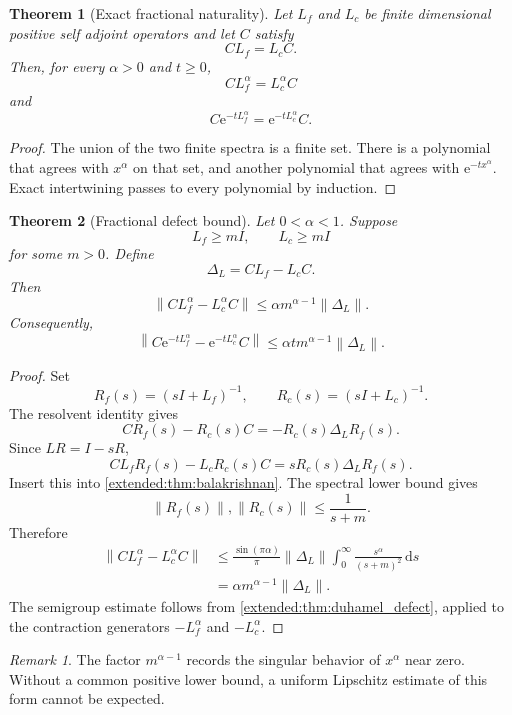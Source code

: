 \documentclass[11pt,letterpaper]{article}
\newtheorem{theorem}{Theorem}[section]
\theoremstyle{plain}
\theoremstyle{plain}
\theoremstyle{plain}
\theoremstyle{definition}
\theoremstyle{definition}
\theoremstyle{definition}
\theoremstyle{definition}
\theoremstyle{definition}
\theoremstyle{remark}
\theoremstyle{remark}
\newtheorem{remark}[remark]{Remark}
\theoremstyle{remark}
\theoremstyle{remark}
\theoremstyle{remark}
\newcommand{\norm}[1]{\left\lVert#1\right\rVert}
\theoremstyle{remark}
\newcommand{\e}{\mathrm e}
\newcommand{\dd}{\,\mathrm d}
\let\KomorebiPrimitivemathrm\mathrm
\renewcommand{\mathrm}[1]{{\KomorebiPrimitivemathrm{#1}}}
\begin{document}
\begin{theorem}[Exact fractional naturality]\label{extended:record:069}\label{extended:thm:exact_fractional_naturality}
Let \(L_f\) and \(L_c\) be finite dimensional positive self adjoint operators and let \(C\) satisfy
\[
CL_f=L_cC.
\]
Then, for every \(\alpha>0\) and \(t\geq0\),
\[
CL_f^\alpha=L_c^\alpha C
\]
and
\[
C\e^{-tL_f^\alpha}
=
\e^{-tL_c^\alpha}C.
\]
\end{theorem}

\begin{proof}
The union of the two finite spectra is a finite set. There is a polynomial that agrees with \(x^\alpha\) on that set, and another polynomial that agrees with \(\e^{-tx^\alpha}\). Exact intertwining passes to every polynomial by induction.
\end{proof}

\begin{theorem}[Fractional defect bound]\label{extended:record:070}\label{extended:thm:fractional_defect}
Let \(0<\alpha<1\). Suppose
\[
L_f\geq mI,
\qquad
L_c\geq mI
\]
for some \(m>0\). Define
\[
\Delta_L=CL_f-L_cC.
\]
Then
\[
\norm{CL_f^\alpha-L_c^\alpha C}
\leq
\alpha m^{\alpha-1}\norm{\Delta_L}.
\]
Consequently,
\[
\norm{
C\e^{-tL_f^\alpha}
-
\e^{-tL_c^\alpha}C
}
\leq
\alpha t m^{\alpha-1}\norm{\Delta_L}.
\]
\end{theorem}

\begin{proof}
Set
\[
R_f(s)=(sI+L_f)^{-1},
\qquad
R_c(s)=(sI+L_c)^{-1}.
\]
The resolvent identity gives
\[
CR_f(s)-R_c(s)C
=
-R_c(s)\Delta_LR_f(s).
\]
Since \(LR=I-sR\),
\[
CL_fR_f(s)-L_cR_c(s)C
=
sR_c(s)\Delta_LR_f(s).
\]
Insert this into \cref{extended:thm:balakrishnan}. The spectral lower bound gives
\[
\norm{R_f(s)},\norm{R_c(s)}
\leq
\frac{1}{s+m}.
\]
Therefore
\[
\begin{aligned}
\norm{CL_f^\alpha-L_c^\alpha C}
&\leq
\frac{\sin(\pi\alpha)}{\pi}
\norm{\Delta_L}
\int_0^\infty
\frac{s^\alpha}{(s+m)^2}\dd s\\
&=
\alpha m^{\alpha-1}\norm{\Delta_L}.
\end{aligned}
\]
The semigroup estimate follows from \cref{extended:thm:duhamel_defect}, applied to the contraction generators \(-L_f^\alpha\) and \(-L_c^\alpha\).
\end{proof}

\begin{remark}\label{extended:record:071}
The factor \(m^{\alpha-1}\) records the singular behavior of \(x^\alpha\) near zero. Without a common positive lower bound, a uniform Lipschitz estimate of this form cannot be expected.
\end{remark}
\end{document}
